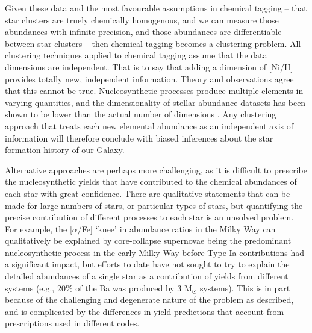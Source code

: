\documentclass[twocolumn]{aastex62}
\begin{document}
Given these data and the most
favourable assumptions in chemical tagging -- that star clusters are truely
chemically homogenous, and we can measure those abundances with infinite precision,
and those abundances are differentiable between star clusters -- then chemical
tagging becomes a clustering problem. All clustering techniques applied to 
chemical tagging assume that the data dimensions are independent. That is to say
that adding a dimension of [Ni/H] provides totally new, independent information.
Theory and observations agree that this cannot be true.
Nucleosynthetic processes produce multiple elements in varying
quantities, and the dimensionality of stellar abundance datasets has been shown
to be lower than the actual number of dimensions \citep{Ting:2012, Price-Jones:2018}.
Any clustering approach that treats each new elemental abundance as an 
independent axis of information will therefore conclude with biased inferences
about the star formation history of our Galaxy. 


Alternative approaches are perhaps more challenging, as it is difficult to prescribe
the nucleosynthetic yields that have contributed to the chemical abundances of each star
with great confidence. There are
qualitative statements that can be made for large numbers of stars, or particular
types of stars, but quantifying the precise contribution of different processes
to each star is an unsolved problem. For example, the [$\alpha$/Fe] `knee' in
abundance ratios in the Milky Way can qualitatively be explained by 
core-collapse supernovae being the predominant nucleosynthetic process in the
early Milky Way before Type Ia contributions had a significant impact, but 
efforts to date have not sought to try to explain the detailed abundances of a 
single star as a contribution of yields from different systems (e.g., 20\% of the
Ba was produced by 3 M$_\odot$ systems). This is in part because of the
challenging and degenerate nature of the problem as described, and is complicated
by the differences in yield predictions that account from prescriptions used in
different codes.
\end{document}
